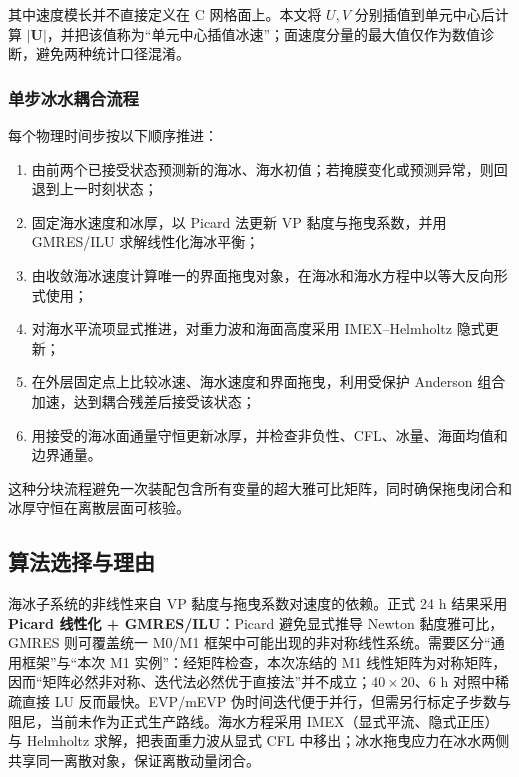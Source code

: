 \documentclass[UTF8,fontset=none]{ctexart}
\newcommand{\vect}[1]{\boldsymbol{#1}}
\begin{document}
其中速度模长并不直接定义在 C 网格面上。本文将 $U,V$ 分别插值到单元中心后计算 $|\vect U|$，并把该值称为“单元中心插值冰速”；面速度分量的最大值仅作为数值诊断，避免两种统计口径混淆。

\subsubsection{单步冰水耦合流程}

每个物理时间步按以下顺序推进：
\begin{enumerate}
\item 由前两个已接受状态预测新的海冰、海水初值；若掩膜变化或预测异常，则回退到上一时刻状态；
\item 固定海水速度和冰厚，以 Picard 法更新 VP 黏度与拖曳系数，并用 GMRES/ILU 求解线性化海冰平衡；
\item 由收敛海冰速度计算唯一的界面拖曳对象，在海冰和海水方程中以等大反向形式使用；
\item 对海水平流项显式推进，对重力波和海面高度采用 IMEX--Helmholtz 隐式更新；
\item 在外层固定点上比较冰速、海水速度和界面拖曳，利用受保护 Anderson 组合加速，达到耦合残差后接受该状态；
\item 用接受的海冰面通量守恒更新冰厚，并检查非负性、CFL、冰量、海面均值和边界通量。
\end{enumerate}
这种分块流程避免一次装配包含所有变量的超大雅可比矩阵，同时确保拖曳闭合和冰厚守恒在离散层面可核验。

\subsection{算法选择与理由}

海冰子系统的非线性来自 VP 黏度与拖曳系数对速度的依赖。正式 24 h 结果采用\textbf{Picard 线性化 + GMRES/ILU}：Picard 避免显式推导 Newton 黏度雅可比，GMRES 则可覆盖统一 M0/M1 框架中可能出现的非对称线性系统\cite{zhang1997,saad2003}。需要区分“通用框架”与“本次 M1 实例”：经矩阵检查，本次冻结的 M1 线性矩阵为对称矩阵，因而“矩阵必然非对称、迭代法必然优于直接法”并不成立；$40\times20$、6 h 对照中稀疏直接 LU 反而最快。EVP/mEVP 伪时间迭代\cite{hunke1997}便于并行，但需另行标定子步数与阻尼，当前未作为正式生产路线。海水方程采用 IMEX（显式平流、隐式正压）与 Helmholtz 求解\cite{ascher1997}，把表面重力波从显式 CFL 中移出；冰水拖曳应力在冰水两侧共享同一离散对象，保证离散动量闭合。
\end{document}
